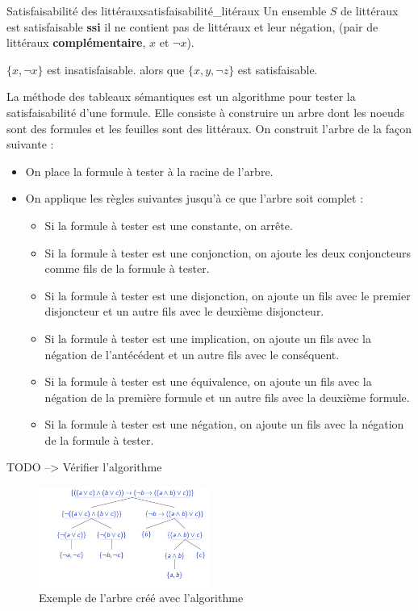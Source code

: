 \begin{theorem}{Satisfaisabilité des littéraux}{satisfaisabilité_litéraux}
  Un ensemble $S$ de littéraux est satisfaisable \textbf{ssi} il ne contient pas de littéraux et leur négation, (pair de littéraux \textbf{complémentaire}, $x$ et $\neg x$).
\end{theorem}
\begin{example}\leavevmode
  $\{x, \neg x\}$ est insatisfaisable. alors que $\{x, y, \neg z\}$ est satisfaisable.
\end{example}
La méthode des tableaux sémantiques est un algorithme pour tester la satisfaisabilité d'une formule. Elle consiste à construire un arbre dont les noeuds sont des formules et les feuilles sont des littéraux. On construit l'arbre de la façon suivante :
\begin{itemize}[label=$\bullet$]
  \item On place la formule à tester à la racine de l'arbre.
  \item On applique les règles suivantes jusqu'à ce que l'arbre soit complet :
  \begin{itemize}[label=$\circ$]
    \item Si la formule à tester est une constante, on arrête.
    \item Si la formule à tester est une conjonction, on ajoute les deux conjoncteurs comme fils de la formule à tester.
    \item Si la formule à tester est une disjonction, on ajoute un fils avec le premier disjoncteur et un autre fils avec le deuxième disjoncteur.
    \item Si la formule à tester est une implication, on ajoute un fils avec la négation de l'antécédent et un autre fils avec le conséquent.
    \item Si la formule à tester est une équivalence, on ajoute un fils avec la négation de la première formule et un autre fils avec la deuxième formule.
    \item Si la formule à tester est une négation, on ajoute un fils avec la négation de la formule à tester.
  \end{itemize}
\end{itemize}
\begin{remark}
  TODO --> Vérifier l'algorithme
\end{remark}
\begin{figure}[H]
  \begin{center}
    \includegraphics[width=0.5\textwidth]{../pictures/tableausem.png}
  \end{center}
  \caption{Exemple de l'arbre créé avec l'algorithme}\label{fig:tableausem}
\end{figure}

